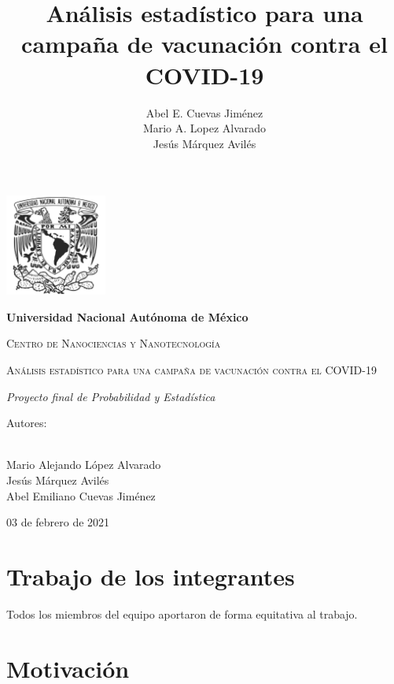 \documentclass[12pt,a4paper]{article}
\author{Abel E. Cuevas Jiménez \\ Mario A. Lopez Alvarado \\ Jesús Márquez Avilés} %
\title{\bf{Análisis estadístico para una campaña de vacunación contra el COVID-19 }}
\begin{document}
\begin{titlepage}
\centering
{\includegraphics[width=0.25\textwidth]{unam.jpg}\par}
\vspace{0.5cm}
{\bfseries\LARGE Universidad Nacional Autónoma de México \par}
\vspace{.5cm}
{\scshape\Large Centro de Nanociencias y Nanotecnología \par}
\vspace{2.5cm}
{\scshape\Huge Análisis estadístico para una campaña de vacunación contra el COVID-19 \par}
\vspace{2.5cm}
{\itshape\Large Proyecto final de Probabilidad y Estadística \par}
\vfill
{\Large Autores: \par}
{\Large \\Mario Alejando López Alvarado\\ Jesús Márquez Avilés\\ Abel Emiliano Cuevas Jiménez\par}
\vfill
{\Large 03 de febrero de 2021 \par}
\end{titlepage}


\newpage
\tableofcontents
\newpage


\section{Trabajo de los integrantes}
\setlength{\parindent}{0cm}
Todos los miembros del equipo aportaron de forma equitativa al trabajo.
\setlength{\parindent}{1cm}


\section{Motivación}
\end{document}
